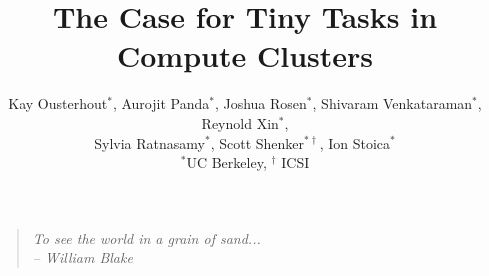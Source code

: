 \documentclass[pdftex,twocolumn,10pt,letterpaper]{article}
\begin{document}
\title{\large \bf The Case for Tiny Tasks in Compute Clusters}
\author{
{\rm Kay Ousterhout$^*$, Aurojit Panda$^*$, Joshua Rosen$^*$, Shivaram Venkataraman$^*$, Reynold Xin$^*$,}\\
\rm{Sylvia Ratnasamy$^*$, Scott Shenker$^{*\dag}$, Ion Stoica$^*$} \\
$^*$UC Berkeley, $^\dag$ ICSI
}
\date{}

\thispagestyle{empty}


\maketitle
\vspace{1in}

\begin{quote}
  \textit{To see the world in a grain of sand...}\\
  \textit{-- William Blake}
\end{quote}





%





\end{document}
